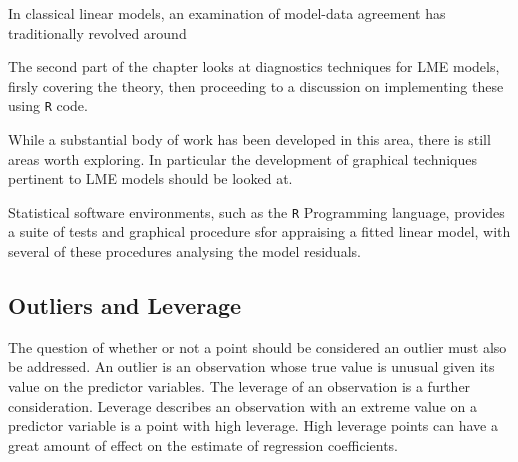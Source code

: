 \documentclass[Main.tex]{subfiles}
\begin{document}
			In classical linear models, an examination of model-data agreement has traditionally revolved around
			
			The second part of the chapter looks at diagnostics techniques for LME models, firsly covering the theory, then proceeding to a discussion on 
			implementing these using \texttt{R} code.
			
			While a substantial body of work has been developed in this area, there is still areas worth exploring. 
			In particular the development of graphical techniques pertinent to LME models should be looked at.
			
			
			
			
			Statistical software environments, such as the \texttt{R} Programming language, provides a suite of tests and graphical procedure sfor appraising a fitted linear model, with several 
			of these procedures analysing the model residuals.
			
			
			
			
			
			\subsection{Outliers and Leverage}
			
			
			
			The question of whether or not a point should be considered an outlier must also be addressed. An outlier is an observation whose true value is unusual given its value on the predictor variables. The leverage of an observation is a further consideration. Leverage describes an observation with an extreme value on a predictor variable is a point with high leverage. High leverage points can have a great amount of effect on the estimate of regression coefficients.
			
\end{document}
